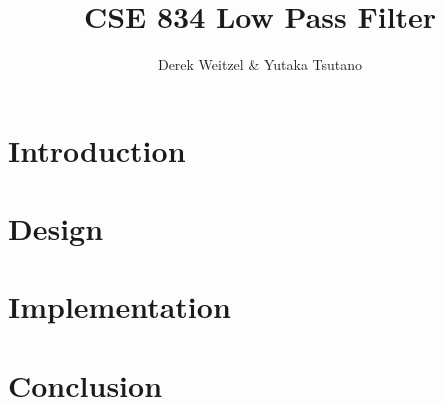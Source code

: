 \documentclass[12pt]{article}
\title{CSE 834 Low Pass Filter}
\author{Derek Weitzel \& Yutaka Tsutano}
\begin{document}
\maketitle

\section{Introduction} \label{sec:introduction}


\section{Design}
\label{sec:design}




\section{Implementation} \label{sec:implementation}


\section{Conclusion} \label{sec:conclusion}







\fi
\end{document}

